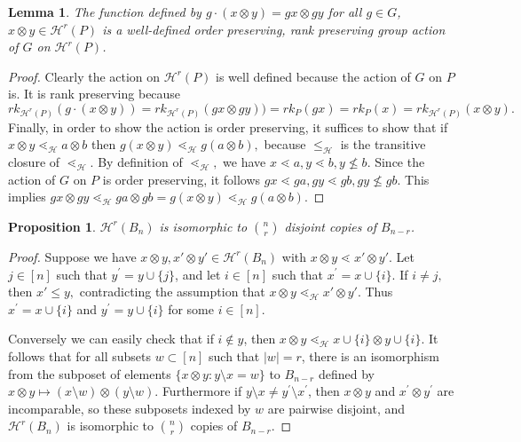 \documentclass{amsart}
\newtheorem{lem}[thm]{Lemma}
\newtheorem{prop}[thm]{Proposition}
\theoremstyle{remark}
\begin{document}
\begin{lem}
\label{lem:G_action_on_HP}
The function defined by $g\cdot (x\otimes y)= gx\otimes gy$ for all $g\in G$, $x\otimes y\in \mathcal{H}^r(P)$ is a well-defined order preserving, rank preserving group action of $G$ on $\mathcal{H}^r(P)$.
\end{lem}

\begin{proof}
Clearly the action on $\mathcal H^r(P)$ is well defined because the action of $G$ on $P$ is. It is rank preserving because $$rk_{\mathcal H^r(P)}(g\cdot(x\otimes y)) = rk_{\mathcal H^r(P)}(gx\otimes gy)) = rk_P(gx)=rk_P(x) = rk_{\mathcal H^r(P)}(x\otimes y).$$
Finally, in order to show the action is order preserving, it suffices to show that if $x\otimes y \lessdot_{\mathcal H} a \otimes b$ then $g(x\otimes y) \lessdot_{\mathcal H} g(a \otimes b),$ because $\leq_{\mathcal H}$ is the transitive closure of $\lessdot_{\mathcal H}.$ By definition of $\lessdot_{\mathcal H},$ we have $x \lessdot a,y\lessdot b,y \not \leq b.$ Since the action of $G$ on $P$ is order preserving, it follows $gx \lessdot ga,gy \lessdot gb, gy \not \leq gb.$ This implies $gx\otimes gy \lessdot_{\mathcal H} ga \otimes gb = g(x\otimes y) \lessdot_{\mathcal H} g(a \otimes b).$
\end{proof}

\begin{prop}\label{prop:computing_HBn}
$\mathcal{H}^r(B_n)$ is isomorphic to $\binom{n}{r}$ disjoint copies of $B_{n-r}$.
\end{prop}

\begin{proof}

Suppose we have $x\otimes y,x'\otimes y' \in \mathcal H^r(B_n)$ with $x\otimes y \lessdot x'\otimes y'.$ Let $j\in [n]$ such that $y^\prime = y\cup\{j\}$, and let $i\in [n]$ such that $x^\prime = x\cup \{i\}$. If $i \ne j,$ then $x' \leq y,$ contradicting the assumption that $x\otimes y \lessdot_{\mathcal H} x'\otimes y'.$ Thus $x^\prime = x\cup\{i\}$ and $y^\prime = y\cup\{i\}$ for some $i\in [n]$.

Conversely we can easily check that if $i\not\in y$, then $x\otimes y\lessdot_{\mathcal{H}} x\cup\{i\}\otimes y\cup\{i\}$.  It follows that for all subsets $w\subset [n]$ such that $|w| = r$, there is an isomorphism from the subposet of elements $\{x\otimes y\colon y\setminus x = w\}$ to $B_{n-r}$ defined by $x\otimes y\mapsto (x\setminus w)\otimes (y\setminus w)$.  Furthermore if $y\setminus x \ne y^\prime \setminus x^\prime$, then $x\otimes y$ and $x^\prime\otimes y^\prime$ are incomparable, so these subposets indexed by $w$ are pairwise disjoint, and $\mathcal{H}^r(B_n)$ is isomorphic to $\binom{n}{r}$ copies of $B_{n-r}$.
\end{proof}
\end{document}
